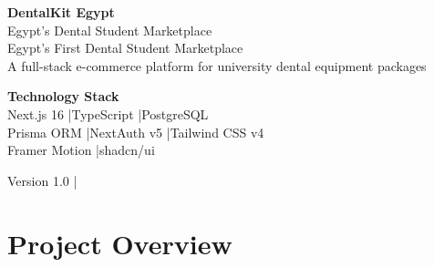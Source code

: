 \documentclass[12pt, a4paper]{article}
\begin{document}
\begin{titlepage}
  \pagecolor{dentalblue}
  \color{white}
  \centering
  \vspace*{3cm}


  \vspace{1cm}
  {\fontsize{36}{44}\selectfont\bfseries DentalKit Egypt}\\[0.4cm]
  {\Large\color{medcyan} Egypt's Dental Student Marketplace}\\[1.2cm]

  {\Large Egypt's First Dental Student Marketplace}\\[0.4cm]
  {\normalsize A full-stack e-commerce platform for university dental equipment packages}

  \vspace{2cm}
  \begin{tcolorbox}[
    colback=white!10!dentalblue,
    colframe=medcyan,
    width=10cm,
    arc=6pt,
  ]
    \centering\color{white}
    \textbf{Technology Stack}\\[0.4cm]
    Next.js 16 \quad|\quad TypeScript \quad|\quad PostgreSQL\\
    Prisma ORM \quad|\quad NextAuth v5 \quad|\quad Tailwind CSS v4\\
    Framer Motion \quad|\quad shadcn/ui
  \end{tcolorbox}

  \vfill
  {\small\color{gray!60!white} Version 1.0 \quad|}
\end{titlepage}
\nopagecolor

\newpage
\tableofcontents
\newpage

\section{Project Overview}
\end{document}
